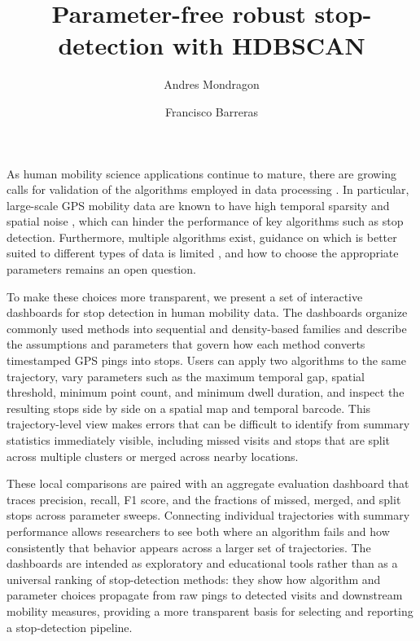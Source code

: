 \documentclass[9pt,twocolumn,twoside]{opticajnl}
\title{Parameter-free robust stop-detection with HDBSCAN}
\author[1]{Andres Mondragon}
\author[1,*]{Francisco Barreras}
\affil[1]{Department of Computer and Information Science, University of Pennsylvania, 3333 Chestnut Street, Philadelphia, PA 19104}
\begin{document}
\maketitle
As human mobility science applications continue to mature, there are growing calls for validation of the algorithms employed in data processing \cite{DESOJO2026102397, barreras2024exciting}. In particular, large-scale GPS mobility data are known to have high temporal sparsity and spatial noise \cite{bahr2022missing, graser2021exploratory, mccool2024maximum, sanchez2026correcting}, which can hinder the performance of key algorithms such as stop detection. Furthermore, multiple algorithms exist, guidance on which is better suited to different types of data is limited \cite{safegraph_visit_attribution, birant2007st, hariharan2004project, xiang2016extracting, chen2014tdbscan, aslak2020infostop}, and how to choose the appropriate parameters remains an open question.

To make these choices more transparent, we present a set of interactive dashboards for stop detection in human mobility data. The dashboards organize commonly used methods into sequential and density-based families and describe the assumptions and parameters that govern how each method converts timestamped GPS pings into stops. Users can apply two algorithms to the same trajectory, vary parameters such as the maximum temporal gap, spatial threshold, minimum point count, and minimum dwell duration, and inspect the resulting stops side by side on a spatial map and temporal barcode. This trajectory-level view makes errors that can be difficult to identify from summary statistics immediately visible, including missed visits and stops that are split across multiple clusters or merged across nearby locations.

These local comparisons are paired with an aggregate evaluation dashboard that traces precision, recall, F1 score, and the fractions of missed, merged, and split stops across parameter sweeps. Connecting individual trajectories with summary performance allows researchers to see both where an algorithm fails and how consistently that behavior appears across a larger set of trajectories. The dashboards are intended as exploratory and educational tools rather than as a universal ranking of stop-detection methods: they show how algorithm and parameter choices propagate from raw pings to detected visits and downstream mobility measures, providing a more transparent basis for selecting and reporting a stop-detection pipeline.
\end{document}
